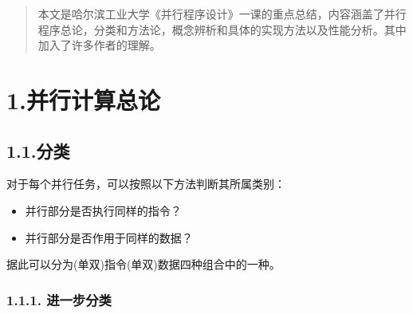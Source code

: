 \documentclass{article}
\begin{document}
\mdxtitleblockstart{}
\mdxauthorstart{}

\mdxauthorend\mdtitleauthorrunning{}{}\mdxtitleblockend%

\begin{abstract}%

\noindent{}本文是哈尔滨工业大学《并行程序设计》一课的重点总结，内容涵盖了并行程序总论，分类和方法论，概念辨析和具体的实现方法以及性能分析。其中加入了许多作者的理解。%
\end{abstract}%

\section{1.\hspace*{0.5em}并行计算总论}\label{section}%

\subsection{1.1.\hspace*{0.5em}分类}\label{section}%

\noindent{}对于每个并行任务，可以按照以下方法判断其所属类别：%

\begin{itemize}[noitemsep,topsep=\mdcompacttopsep]%

\item{}并行部分是否执行同样的指令？%

\item{}并行部分是否作用于同样的数据？%
\end{itemize}%

\noindent{}据此可以分为(单\textbar{}双)指令(单\textbar{}双)数据四种组合中的一种。%

\subsubsection{1.1.1.\hspace*{0.5em} 进一步分类}\label{sec-mimd-}%
\end{document}
